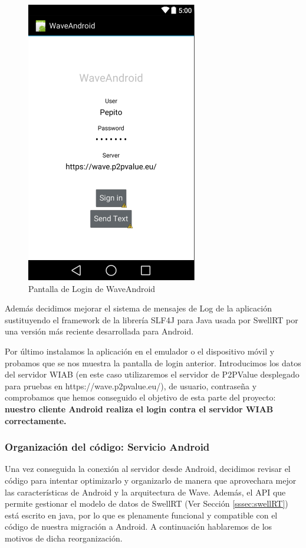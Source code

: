     	\begin{figure}[H]
      \centering
	\includegraphics[keepaspectratio, scale=0.6]{Media/Captures/waveAndroidLogin.png}
      \caption{Pantalla de Login de WaveAndroid}
      \label{fig:android_waveLogin}
    \end{figure}
    
    Además decidimos mejorar el sistema de mensajes de Log de la aplicación sustituyendo el framework de la librería SLF4J para Java usada por SwellRT por una versión más reciente desarrollada para Android\cite{ref:slf4j_android}.
        
    Por último instalamos la aplicación en el emulador o el dispositivo móvil y probamos que se nos muestra la pantalla de login anterior. Introducimos los datos del servidor WIAB (en este caso utilizaremos el servidor de P2PValue desplegado para pruebas en https://wave.p2pvalue.eu/), de usuario, contraseña y comprobamos que hemos conseguido el objetivo de esta parte del proyecto: \textbf{nuestro cliente Android realiza el login contra el servidor WIAB correctamente.} 
     
    		\subsubsection{Organización del código: Servicio Android}
    
    Una vez conseguida la conexión al servidor desde Android, decidimos revisar el código para intentar optimizarlo y organizarlo de manera que aprovechara mejor las características de Android y la arquitectura de Wave. Además, el API que permite gestionar el modelo de datos de SwellRT (Ver Sección \ref{sssec:swellRT}) está escrito en java, por lo que es plenamente funcional y compatible con el código de nuestra migración a Android. A continuación hablaremos de los motivos de dicha reorganización.
  
